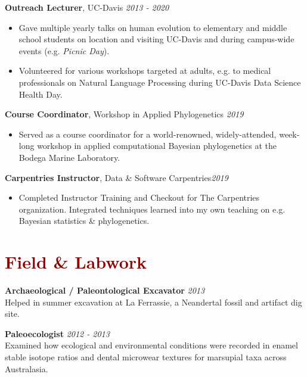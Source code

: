 \documentclass[11pt,margin,line]{resume}
\begin{document}
\begin{resume}
\textbf{Outreach Lecturer}, UC-Davis \hfill \emph{2013  - 2020}\\
\begin{itemize}[noitemsep]
\vspace{-4.5mm} \item Gave multiple yearly talks on human evolution to elementary and middle school students on location and visiting UC-Davis and during campus-wide events (e.g. \emph{Picnic Day}). 
\item Volunteered for various workshops targeted at adults, e.g. to medical professionals on Natural Language Processing during UC-Davis Data Science Health Day.
\end{itemize}
\vspace{-1.5mm}

\textbf{Course Coordinator}, Workshop in Applied Phylogenetics \hfill \emph{2019}
\begin{itemize}[noitemsep]
\item Served as a course coordinator for a world-renowned, widely-attended, week-long workshop in applied computational Bayesian phylogenetics at the Bodega Marine Laboratory.
\end{itemize}
\vspace{-1.5mm}

\textbf{Carpentries Instructor}, Data \& Software Carpentries\hfill \emph{2019}
\begin{itemize}[noitemsep]
\item Completed Instructor Training and Checkout for The Carpentries organization. Integrated techniques learned into my own teaching on e.g. Bayesian statistics \& phylogenetics.\\
\end{itemize}
\vspace{-4.5mm}

\section{\large\textcolor{DarkRed}{Field \& Labwork}}

\textbf{Archaeological / Paleontological Excavator} \hfill \emph{2013}\\
Helped in summer excavation at La Ferrassie, a Neandertal fossil and artifact dig site.
\vspace{-1.5mm}

\textbf{Paleoecologist} \hfill \emph{2012 - 2013}\\
Examined how ecological and environmental conditions were recorded in enamel stable isotope ratios and dental microwear textures for marsupial taxa across Australasia.
\vspace{-1.5mm}


\end{resume}
\end{document}
